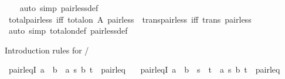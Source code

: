 \begin{isabellebody}
%
\isadelimproof
\ \ %
\endisadelimproof
%
\isatagproof
{}\isamarkupfalse%
\ {\isacharparenleft}{\kern0pt}auto\ simp{\isacharcolon}{\kern0pt}\ pair{\isacharunderscore}{\kern0pt}less{\isacharunderscore}{\kern0pt}def{\isacharparenright}{\kern0pt}%
\endisatagproof
{\isafoldproof}%
%
\isadelimproof
\isanewline
%
\endisadelimproof
\isanewline
{}\isamarkupfalse%
\ total{\isacharunderscore}{\kern0pt}pair{\isacharunderscore}{\kern0pt}less\ {\isacharbrackleft}{\kern0pt}iff{\isacharbrackright}{\kern0pt}{\isacharcolon}{\kern0pt}\ {\isachardoublequoteopen}total{\isacharunderscore}{\kern0pt}on\ A\ pair{\isacharunderscore}{\kern0pt}less{\isachardoublequoteclose}\ \ trans{\isacharunderscore}{\kern0pt}pair{\isacharunderscore}{\kern0pt}less\ {\isacharbrackleft}{\kern0pt}iff{\isacharbrackright}{\kern0pt}{\isacharcolon}{\kern0pt}\ {\isachardoublequoteopen}trans\ pair{\isacharunderscore}{\kern0pt}less{\isachardoublequoteclose}\isanewline
%
\isadelimproof
\ \ %
\endisadelimproof
%
\isatagproof
{}\isamarkupfalse%
\ {\isacharparenleft}{\kern0pt}auto\ simp{\isacharcolon}{\kern0pt}\ total{\isacharunderscore}{\kern0pt}on{\isacharunderscore}{\kern0pt}def\ pair{\isacharunderscore}{\kern0pt}less{\isacharunderscore}{\kern0pt}def{\isacharparenright}{\kern0pt}%
\endisatagproof
{\isafoldproof}%
%
\isadelimproof
%
\endisadelimproof
%
\begin{isamarkuptext}%
Introduction rules for /%
\end{isamarkuptext}\isamarkuptrue%
\isamarkupfalse%
\ pair{\isacharunderscore}{\kern0pt}leqI{}{\isacharcolon}{\kern0pt}\ {\isachardoublequoteopen}a\ {\isacharless}{\kern0pt}\ b\ {\isasymLongrightarrow}\ {\isacharparenleft}{\kern0pt}{\isacharparenleft}{\kern0pt}a{\isacharcomma}{\kern0pt}\ s{\isacharparenright}{\kern0pt}{\isacharcomma}{\kern0pt}\ {\isacharparenleft}{\kern0pt}b{\isacharcomma}{\kern0pt}\ t{\isacharparenright}{\kern0pt}{\isacharparenright}{\kern0pt}\ {\isasymin}\ pair{\isacharunderscore}{\kern0pt}leq{\isachardoublequoteclose}\isanewline
\ \ \ pair{\isacharunderscore}{\kern0pt}leqI{}{\isacharcolon}{\kern0pt}\ {\isachardoublequoteopen}a\ {\isasymle}\ b\ {\isasymLongrightarrow}\ s\ {\isasymle}\ t\ {\isasymLongrightarrow}\ {\isacharparenleft}{\kern0pt}{\isacharparenleft}{\kern0pt}a{\isacharcomma}{\kern0pt}\ s{\isacharparenright}{\kern0pt}{\isacharcomma}{\kern0pt}\ {\isacharparenleft}{\kern0pt}b{\isacharcomma}{\kern0pt}\ t{\isacharparenright}{\kern0pt}{\isacharparenright}{\kern0pt}\ {\isasymin}\ pair{\isacharunderscore}{\kern0pt}leq{\isachardoublequoteclose}\isanewline

\end{isabellebody}
